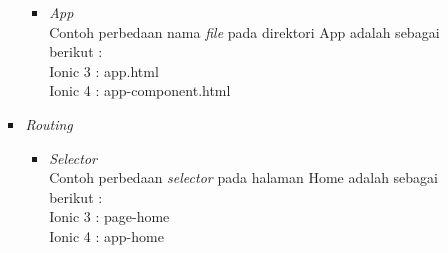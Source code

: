 \begin{enumerate}
\begin{enumerate}
\begin{itemize}
\begin{itemize}
				\item {\it App} \\
				Contoh perbedaan nama {\it file} pada direktori App adalah sebagai berikut : \\
				Ionic 3 : app.html \\
				Ionic 4 : app-component.html
			\end{itemize}

			\item {\it Routing}
			\begin{itemize}
				\item {\it Selector} \\
				Contoh perbedaan {\it selector} pada halaman Home adalah sebagai berikut :\\
				Ionic 3 : page-home  \\
				Ionic 4 : app-home
			\end{itemize}
			

\end{itemize}
\end{enumerate}
\end{enumerate}
